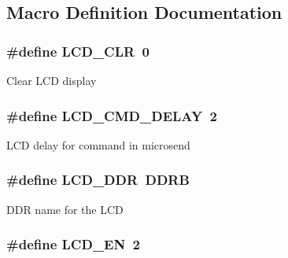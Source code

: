 \subsection{Macro Definition Documentation}
\hypertarget{group__ex4__lcd_ga459688213267d13ccfbeb2c9004988cb}{
\subsubsection[{L\-C\-D\-\_\-\-C\-L\-R}]{\setlength{\rightskip}{0pt plus 5cm}\#define L\-C\-D\-\_\-\-C\-L\-R~0}}\label{group__ex4__lcd_ga459688213267d13ccfbeb2c9004988cb}
Clear L\-C\-D display \hypertarget{group__ex4__lcd_gabd61e4c479048bc94dc1bd416f1890cd}{
\subsubsection[{L\-C\-D\-\_\-\-C\-M\-D\-\_\-\-D\-E\-L\-A\-Y}]{\setlength{\rightskip}{0pt plus 5cm}\#define L\-C\-D\-\_\-\-C\-M\-D\-\_\-\-D\-E\-L\-A\-Y~2}}\label{group__ex4__lcd_gabd61e4c479048bc94dc1bd416f1890cd}
L\-C\-D delay for command in microsend \hypertarget{group__ex4__lcd_ga152b3af754524f57cde037df1d8b7b29}{
\subsubsection[{L\-C\-D\-\_\-\-D\-D\-R}]{\setlength{\rightskip}{0pt plus 5cm}\#define L\-C\-D\-\_\-\-D\-D\-R~D\-D\-R\-B}}\label{group__ex4__lcd_ga152b3af754524f57cde037df1d8b7b29}
D\-D\-R name for the L\-C\-D \hypertarget{group__ex4__lcd_ga1640ffbc0d8ec0f7edb04a2b93918072}{
\subsubsection[{L\-C\-D\-\_\-\-E\-N}]{\setlength{\rightskip}{0pt plus 5cm}\#define L\-C\-D\-\_\-\-E\-N~2}}\label{group__ex4__lcd_ga1640ffbc0d8ec0f7edb04a2b93918072}
